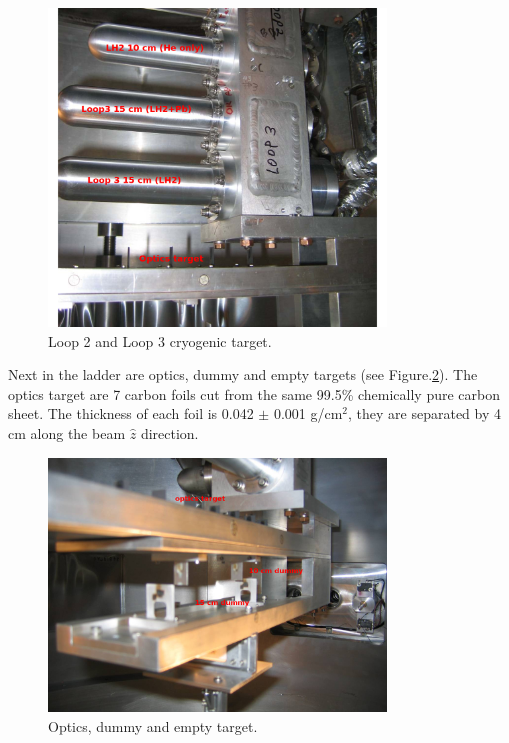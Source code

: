 \begin{figure}[tb!]
\centering
\includegraphics[width=0.8\textwidth]{figs/Loop2_Loop3_target_edit.png}
\caption[Loop 2 and Loop 3 cryogenic target ]{Loop 2 and Loop 3 cryogenic target. }\label{fig:loop2_loop3}
\end{figure}


Next in the ladder are optics, dummy and empty targets (see Figure.\ref{fig:optics_dummy}).
The optics target are 7 carbon foils cut from the same 99.5\% chemically pure carbon sheet.
The thickness of each foil is 0.042 $\pm$ 0.001 g/cm$^2$, they are separated by 4 cm along the beam $\hat{z}$ direction.

\begin{figure}[tb!]
\centering
\includegraphics[width=0.8\textwidth]{figs/optics_dummy_target_edit.png}
\caption[Optics, dummy and empty target ]{Optics, dummy and empty target. }\label{fig:optics_dummy}
\end{figure}

